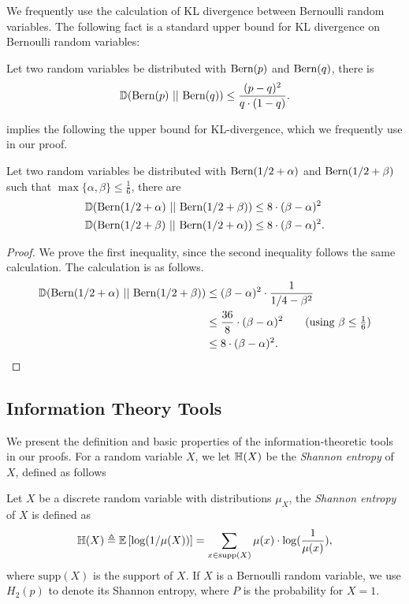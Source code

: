 We frequently use the calculation of KL divergence between Bernoulli random variables. The following fact is a standard upper bound for KL divergence on Bernoulli random variables:
\begin{fact}
	\label{fct:bernoulli-KL}
	Let two random variables be distributed with $\textnormal{Bern}(p)$ and $\textnormal{Bern}(q)$, there is
	\begin{align*}
		\mathbb{D}(\textnormal{Bern}(p)~||~\textnormal{Bern}(q))\leq \frac{(p-q)^2}{q\cdot (1-q)}.
	\end{align*}
\end{fact}


 implies the following the upper bound for KL-divergence, which we frequently use in our proof.

\begin{claim}
\label{clm:bernoulli-KL}
Let two random variables be distributed with $\textnormal{Bern}(1/2+\alpha)$ and $\textnormal{Bern}(1/2+\beta)$ such that $\max\{\alpha,\beta\}\leq \frac{1}{6}$, there are
\begin{align*}
	& \mathbb{D}(\textnormal{Bern}(1/2+\alpha)~||~\textnormal{Bern}(1/2+\beta)) \leq 8\cdot (\beta-\alpha)^2\\
	& \mathbb{D}(\textnormal{Bern}(1/2+\beta)~||~\textnormal{Bern}(1/2+\alpha)) \leq 8\cdot (\beta-\alpha)^2.
\end{align*}
\end{claim}
\begin{proof}
We prove the first inequality, since the second inequality follows the same calculation. The calculation is as follows.
\begin{align*}
	\kl{\bern{1/2+\alpha}}{\bern{1/2+\beta}} & \leq (\beta-\alpha)^2 \cdot \frac{1}{1/4-\beta^2}\\
	& \leq \frac{36}{8}\cdot (\beta-\alpha)^2 \tag{using $\beta\leq \frac{1}{6}$}\\
	&\leq 8\cdot (\beta-\alpha)^2.
\end{align*}
\end{proof}

\subsection{Information Theory Tools}
\label{subsec:info-theory}
We present the definition and basic properties of the information-theoretic tools in our proofs. For a random variable $X$, we let $\mathbb{H}(X)$ be the \emph{Shannon entropy} of $X$, defined as follows
\begin{definition}
	\label{def:entropy}
	Let $X$ be a discrete random variable with distributions $\mu_{X}$, the \emph{Shannon entropy} of $X$ is defined as
	\begin{align*}
		\mathbb{H}(X) \triangleq \operatorname*{{\mathbb{E}}}\left[\log(1/\mu(X))\right] =\sum_{x \in \text{supp}(X)} \mu(x)\cdot \log(\frac{1}{\mu(x)}),
	\end{align*}
	where $\text{supp}(X)$ is the support of $X$. If $X$ is a Bernoulli random variable, we use $H_2(p)$ to denote its Shannon entropy, where $P$ is the probability for $X=1$.
\end{definition}

